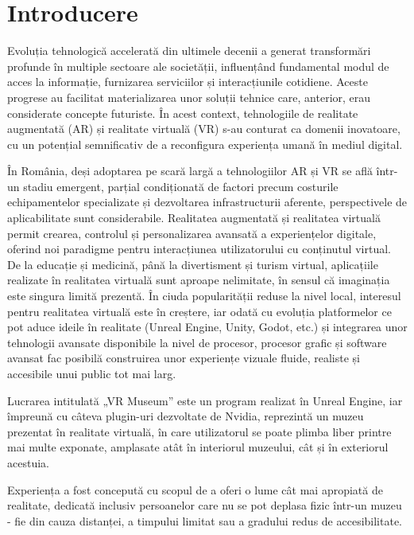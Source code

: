\chapter{Introducere}
\label{cap:cap1}

Evoluția tehnologică accelerată din ultimele decenii a generat transformări profunde în multiple sectoare ale societății, influențând fundamental modul de acces la informație, furnizarea serviciilor și interacțiunile cotidiene. Aceste progrese au facilitat materializarea unor soluții tehnice care, anterior, erau considerate concepte futuriste. În acest context, tehnologiile de realitate augmentată (AR) și realitate virtuală (VR) s-au conturat ca domenii inovatoare, cu un potențial semnificativ de a reconfigura experiența umană în mediul digital.

În România, deși adoptarea pe scară largă a tehnologiilor AR și VR se află într-un stadiu emergent, parțial condiționată de factori precum costurile echipamentelor specializate și dezvoltarea infrastructurii aferente, perspectivele de aplicabilitate sunt considerabile. Realitatea augmentată și realitatea virtuală permit crearea, controlul și personalizarea avansată a experiențelor digitale, oferind noi paradigme pentru interacțiunea utilizatorului cu conținutul virtual. De la educație și medicină, până la divertisment și turism virtual, aplicațiile realizate în realitatea virtuală sunt aproape nelimitate, în sensul că imaginația este singura limită prezentă. În ciuda popularității reduse la nivel local, interesul pentru realitatea virtuală este în creștere, iar odată cu evoluția platformelor ce pot aduce ideile în realitate (Unreal Engine, Unity, Godot, etc.) și integrarea unor tehnologii avansate disponibile la nivel de procesor, procesor grafic și software avansat fac posibilă construirea unor experiențe vizuale fluide, realiste și accesibile unui public tot mai larg.

Lucrarea intitulată „VR Museum” este un program realizat în Unreal Engine, iar împreună cu câteva plugin-uri dezvoltate de Nvidia, reprezintă un muzeu prezentat în realitate virtuală, în care utilizatorul se poate plimba liber printre mai multe exponate, amplasate atât în interiorul muzeului, cât și în exteriorul acestuia. 

Experiența a fost concepută cu scopul de a oferi o lume cât mai apropiată de realitate, dedicată inclusiv persoanelor care nu se pot deplasa fizic într-un muzeu - fie din cauza distanței, a timpului limitat sau a gradului redus de accesibilitate.

